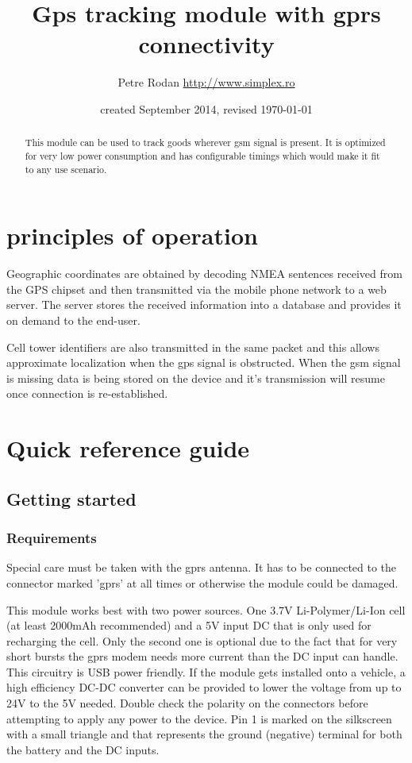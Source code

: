 \documentclass[a4paper,twoside]{refart}
\begin{document}
\title{Gps tracking module with gprs connectivity}
\author{Petre Rodan \url{http://www.simplex.ro}}
\date{created September 2014, revised \today}
\maketitle

\begin{abstract}
This module can be used to track goods wherever gsm signal is present. It is optimized for very low power consumption and has configurable timings which would make it fit to any use scenario.
\end{abstract}


\tableofcontents
\newpage

\section{principles of operation}
Geographic coordinates are obtained by decoding NMEA sentences received from the GPS chipset and then transmitted via the mobile phone network to a web server. The server stores the received information into a database and provides it on demand to the end-user.

Cell tower identifiers are also transmitted in the same packet and this allows approximate localization when the gps signal is obstructed. When the gsm signal is missing data is being stored on the device and it's transmission will resume once connection is re-established.

\section{Quick reference guide}

\subsection{Getting started}

\subsubsection{Requirements}

 Special care must be taken with the gprs antenna. It has to be connected to the connector marked 'gprs' at all times or otherwise the module could be damaged.

This module works best with two power sources. One 3.7V Li-Polymer/Li-Ion cell (at least 2000mAh recommended) and a 5V input DC that is only used for recharging the cell. Only the second one is optional due to the fact that for very short bursts the gprs modem needs more current than the DC input can handle. This circuitry is USB power friendly. If the module gets installed onto a vehicle, a high efficiency DC-DC converter can be provided to lower the voltage from up to 24V to the 5V needed. Double check the polarity on the connectors before attempting to apply any power to the device. Pin 1 is marked on the silkscreen with a small triangle and that represents the ground (negative) terminal for both the battery and the DC inputs.
\end{document}
